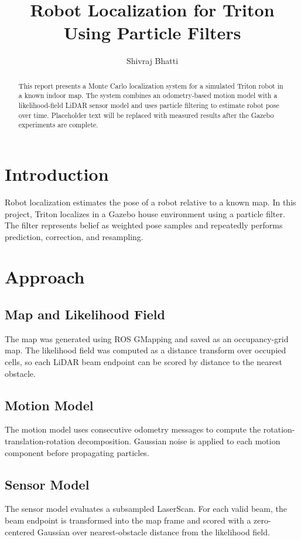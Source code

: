 \documentclass[letterpaper, 10 pt, conference]{ieeeconf}
\title{\LARGE \bf
Robot Localization for Triton Using Particle Filters
}
\author{Shivraj Bhatti}
\begin{document}
\maketitle
\thispagestyle{empty}
\pagestyle{empty}

\begin{abstract}
This report presents a Monte Carlo localization system for a simulated Triton
robot in a known indoor map. The system combines an odometry-based motion model
with a likelihood-field LiDAR sensor model and uses particle filtering to
estimate robot pose over time. Placeholder text will be replaced with measured
results after the Gazebo experiments are complete.
\end{abstract}

\section{Introduction}
Robot localization estimates the pose of a robot relative to a known map. In
this project, Triton localizes in a Gazebo house environment using a particle
filter. The filter represents belief as weighted pose samples and repeatedly
performs prediction, correction, and resampling.

\section{Approach}
\subsection{Map and Likelihood Field}
The map was generated using ROS GMapping and saved as an occupancy-grid map.
The likelihood field was computed as a distance transform over occupied cells,
so each LiDAR beam endpoint can be scored by distance to the nearest obstacle.

\subsection{Motion Model}
The motion model uses consecutive odometry messages to compute the
rotation-translation-rotation decomposition. Gaussian noise is applied to each
motion component before propagating particles.

\subsection{Sensor Model}
The sensor model evaluates a subsampled LaserScan. For each valid beam, the
beam endpoint is transformed into the map frame and scored with a zero-centered
Gaussian over nearest-obstacle distance from the likelihood field.
\end{document}

